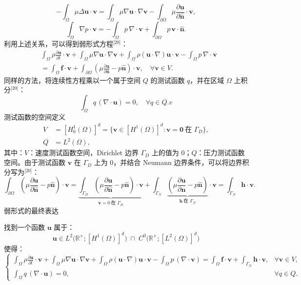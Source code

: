 $$
-\int_{\Omega} \mu \Delta \mathbf{u} \cdot \mathbf{v}
= \int_{\Omega} \mu \nabla \mathbf{u} \cdot \nabla \mathbf{v}
- \int_{\partial \Omega} \mu 
\frac{\partial \mathbf{u}}{\partial \hat{\mathbf{n}}} 
\cdot \mathbf{v},~
$$
$$
\int_{\Omega} \nabla p \cdot \mathbf{v}
= -\int_{\Omega} p \, \nabla \cdot \mathbf{v}
+ \int_{\partial \Omega} p \, \mathbf{v} \cdot \hat{\mathbf{n}}.~
$$
利用上述关系，可以得到弱形式方程\(^\text{[20]}\)：
$$
\begin{aligned}
&\int_{\Omega} 
\rho \frac{\partial \mathbf{u}}{\partial t} \cdot \mathbf{v}
+ \int_{\Omega} 
\mu \nabla \mathbf{u} \cdot \nabla \mathbf{v}
+ \int_{\Omega} 
\rho (\mathbf{u} \cdot \nabla) \mathbf{u} \cdot \mathbf{v}
- \int_{\Omega} 
p \, \nabla \cdot \mathbf{v} \\
&= 
\int_{\Omega} 
\mathbf{f} \cdot \mathbf{v}
+ \int_{\partial \Omega} 
\left(
\mu \frac{\partial \mathbf{u}}{\partial \hat{\mathbf{n}}}
- p \hat{\mathbf{n}}
\right) 
\cdot \mathbf{v},
\quad
\forall \mathbf{v} \in V.
\end{aligned}~
$$
同样的方法，将连续性方程乘以一个属于空间 $Q$ 的测试函数 $q$，并在区域 $\Omega$ 上积分\(^\text{[20]}\)：
$$
\int_{\Omega} q \, (\nabla \cdot \mathbf{u}) = 0,
\quad \forall q \in Q.v~
$$
测试函数的空间定义
$$
\begin{aligned}
V &= [H_0^1(\Omega)]^d
= \big\{ \mathbf{v} \in [H^1(\Omega)]^d : 
\mathbf{v} = \mathbf{0} \ \text{在 } \Gamma_D \big\},\\
Q &= L^2(\Omega),
\end{aligned}~
$$
其中：$V$：速度测试函数空间，Dirichlet 边界 $\Gamma_D$ 上的值为 0；$Q$：压力测试函数空间。由于测试函数 $\mathbf{v}$ 在 $\Gamma_D$ 上为 0，并结合 Neumann 边界条件，可以将边界积分写为\(^\text{[20]}\)：
$$
\int_{\partial \Omega}
\left(
\mu \frac{\partial \mathbf{u}}{\partial \hat{\mathbf{n}}}
- p \hat{\mathbf{n}}
\right) \cdot \mathbf{v}
=
\underbrace{
\int_{\Gamma_D}
\left(
\mu \frac{\partial \mathbf{u}}{\partial \hat{\mathbf{n}}}
- p \hat{\mathbf{n}}
\right) \cdot \mathbf{v}
}_{\mathbf{v}=0 \ \text{在 } \Gamma_D}
+
\int_{\Gamma_N}
\underbrace{
\left(
\mu \frac{\partial \mathbf{u}}{\partial \hat{\mathbf{n}}}
- p \hat{\mathbf{n}}
\right)
}_{\mathbf{h} \ \text{在 } \Gamma_N}
\cdot \mathbf{v}
=
\int_{\Gamma_N}
\mathbf{h} \cdot \mathbf{v}.~
$$
弱形式的最终表达

找到一个函数 $\mathbf{u}$ 属于：
$$
\mathbf{u} \in
L^2\big(\mathbb{R}^+; [H^1(\Omega)]^d\big)
\;\cap\;
C^0\big(\mathbb{R}^+; [L^2(\Omega)]^d\big)~
$$
使得：
$$
\begin{cases}
\displaystyle
\int_{\Omega} \rho \frac{\partial \mathbf{u}}{\partial t} \cdot \mathbf{v}
+ \int_{\Omega} \mu \nabla \mathbf{u} \cdot \nabla \mathbf{v}
+ \int_{\Omega} \rho (\mathbf{u} \cdot \nabla) \mathbf{u} \cdot \mathbf{v}
- \int_{\Omega} p \, (\nabla \cdot \mathbf{v})
= \int_{\Omega} \mathbf{f} \cdot \mathbf{v}
+ \int_{\Gamma_N} \mathbf{h} \cdot \mathbf{v},
& \forall \mathbf{v} \in V, \\[8pt]
\displaystyle
\int_{\Omega} q \, (\nabla \cdot \mathbf{u})
= 0,
& \forall q \in Q.
\end{cases}~
$$
